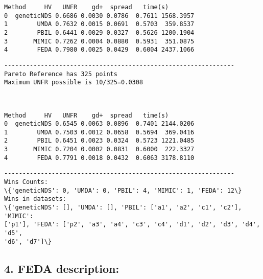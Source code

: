 \documentclass[11pt]{article}
\begin{document}
    
    \begin{Verbatim}[commandchars=\\\{\}]
       Method     HV   UNFR    gd+  spread   time(s)
0  geneticNDS 0.6686 0.0030 0.0786  0.7611 1568.3957
1        UMDA 0.7632 0.0015 0.0691  0.5703  359.8537
2        PBIL 0.6441 0.0029 0.0327  0.5626 1200.1904
3       MIMIC 0.7262 0.0004 0.0880  0.5931  351.0875
4        FEDA 0.7980 0.0025 0.0429  0.6004 2437.1066
    \end{Verbatim}

    
    \begin{Verbatim}[commandchars=\\\{\}]
---------------------------------------------------------------
Pareto Reference has 325 points
Maximum UNFR possible is 10/325=0.0308
    \end{Verbatim}

    \begin{center}
    \end{center}
    { \hspace*{\fill} \\}
    
    
    \begin{Verbatim}[commandchars=\\\{\}]
       Method     HV   UNFR    gd+  spread   time(s)
0  geneticNDS 0.6545 0.0063 0.0896  0.7401 2144.0206
1        UMDA 0.7503 0.0012 0.0658  0.5694  369.0416
2        PBIL 0.6451 0.0023 0.0324  0.5723 1221.0485
3       MIMIC 0.7204 0.0002 0.0831  0.6000  222.3327
4        FEDA 0.7791 0.0018 0.0432  0.6063 3178.8110
    \end{Verbatim}

    
    \begin{Verbatim}[commandchars=\\\{\}]
---------------------------------------------------------------
Wins Counts:
\{'geneticNDS': 0, 'UMDA': 0, 'PBIL': 4, 'MIMIC': 1, 'FEDA': 12\}
Wins in datasets:
\{'geneticNDS': [], 'UMDA': [], 'PBIL': ['a1', 'a2', 'c1', 'c2'], 'MIMIC':
['p1'], 'FEDA': ['p2', 'a3', 'a4', 'c3', 'c4', 'd1', 'd2', 'd3', 'd4', 'd5',
'd6', 'd7']\}
    \end{Verbatim}

    \subsection{4. FEDA description:}\label{feda-description}
\end{document}
